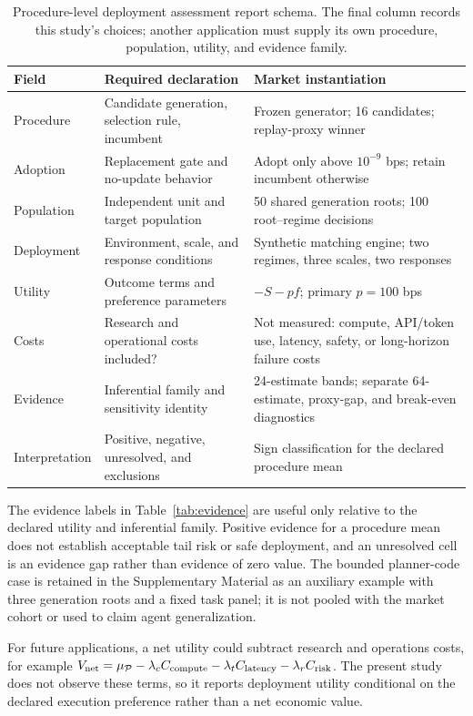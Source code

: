 \documentclass[10pt,letterpaper]{article}
\begin{document}
\begin{table}[t]\centering\small
\begin{tabular}{@{}p{.19\linewidth}p{.34\linewidth}p{.36\linewidth}@{}}\toprule
Field & Required declaration & Market instantiation\\\midrule
Procedure & Candidate generation, selection rule, incumbent & Frozen generator; 16 candidates; replay-proxy winner\\
Adoption & Replacement gate and no-update behavior & Adopt only above $10^{-9}$ bps; retain incumbent otherwise\\
Population & Independent unit and target population & 50 shared generation roots; 100 root--regime decisions\\
Deployment & Environment, scale, and response conditions & Synthetic matching engine; two regimes, three scales, two responses\\
Utility & Outcome terms and preference parameters & $-S-pf$; primary $p=100$ bps\\
Costs & Research and operational costs included? & Not measured: compute, API/token use, latency, safety, or long-horizon failure costs\\
Evidence & Inferential family and sensitivity identity & 24-estimate bands; separate 64-estimate, proxy-gap, and break-even diagnostics\\
Interpretation & Positive, negative, unresolved, and exclusions & Sign classification for the declared procedure mean\\\bottomrule
\end{tabular}
\caption{Procedure-level deployment assessment report schema. The final column records this study's choices; another application must supply its own procedure, population, utility, and evidence family.}\label{tab:report-schema}
\end{table}

The evidence labels in Table~\ref{tab:evidence} are useful only relative to the declared utility and inferential family. Positive evidence for a procedure mean does not establish acceptable tail risk or safe deployment, and an unresolved cell is an evidence gap rather than evidence of zero value. The bounded planner-code case is retained in the Supplementary Material as an auxiliary example with three generation roots and a fixed task panel; it is not pooled with the market cohort or used to claim agent generalization.

For future applications, a net utility could subtract research and operations costs, for example $V_{\rm net}=\mu_{\mathcal P}-\lambda_c C_{\rm compute}-\lambda_t C_{\rm latency}-\lambda_r C_{\rm risk}$. The present study does not observe these terms, so it reports deployment utility conditional on the declared execution preference rather than a net economic value.
\end{document}

